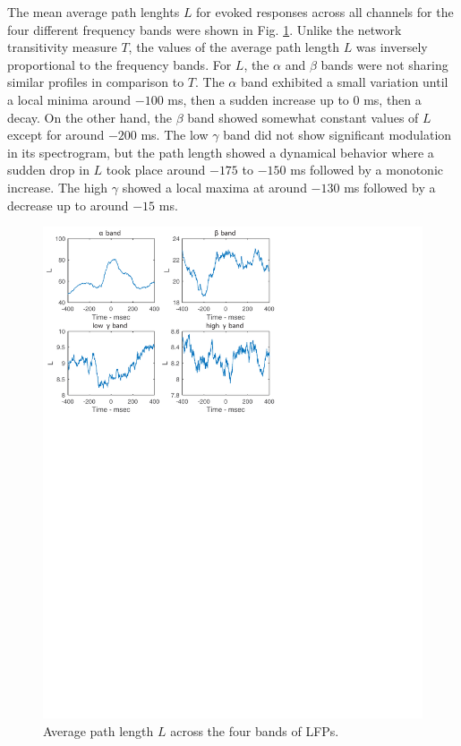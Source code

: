 \documentclass[letterpaper, 9pt, conference]{ieeeconf}
\begin{document}
The mean average path lenghts $L$  for evoked responses across all channels for the four different frequency bands were shown in Fig. \ref{fig:GC_high}. Unlike the network transitivity measure $T$, the values of the average path length $L$ was inversely proportional to the frequency bands. For $L$, the $\alpha$ and $\beta$ bands were not sharing similar profiles in comparison to $T$. The $\alpha$ band exhibited a small variation until a local minima around $-100$ ms, then a sudden increase up to $0$ ms, then a decay. On the other hand, the $\beta$ band showed somewhat constant values of $L$ except for around $-200$ ms. The low $\gamma$ band did not show significant modulation in its spectrogram, but the path length showed a dynamical behavior where a sudden drop in $L$ took place around $-175$ to $-150$ ms followed by a monotonic increase. The high $\gamma$ showed a local maxima at around $-130$ ms followed by a decrease up to around $-15$ ms.
 
 
\begin{figure}[ht!]
                             \includegraphics[scale=0.6]{L_Multiple_Bands.pdf}
                             \vspace{-4.2in}
                             \caption{\label{fig:GC_high} Average path length $L$ across the four bands of LFPs.}
\end{figure}
\end{document}
